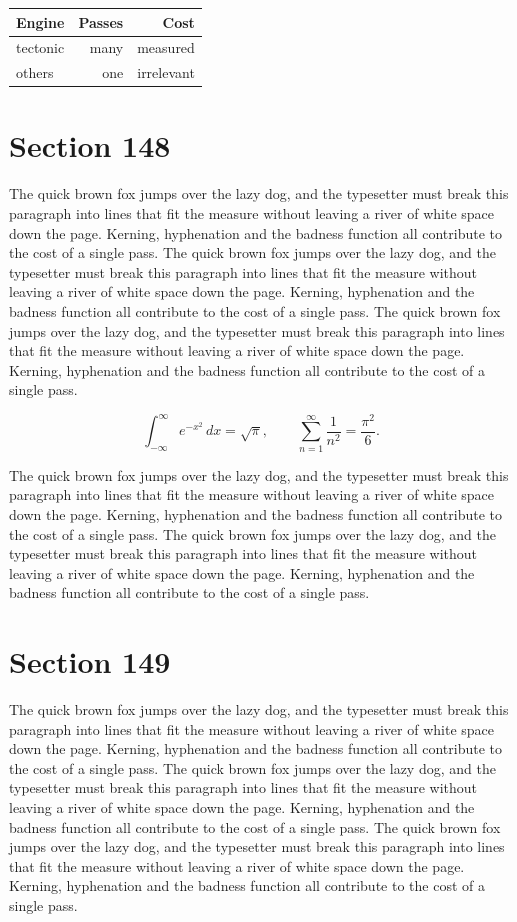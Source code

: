 \documentclass{article}
\begin{document}
\begin{center}
\begin{tabular}{lrr}
\toprule
Engine & Passes & Cost \\
\midrule
tectonic & many & measured \\
others & one & irrelevant \\
\bottomrule
\end{tabular}
\end{center}

\section{Section 148}
The quick brown fox jumps over the lazy dog, and the typesetter must break this paragraph into lines that fit the measure without leaving a river of white space down the page. Kerning, hyphenation and the badness function all contribute to the cost of a single pass. The quick brown fox jumps over the lazy dog, and the typesetter must break this paragraph into lines that fit the measure without leaving a river of white space down the page. Kerning, hyphenation and the badness function all contribute to the cost of a single pass. The quick brown fox jumps over the lazy dog, and the typesetter must break this paragraph into lines that fit the measure without leaving a river of white space down the page. Kerning, hyphenation and the badness function all contribute to the cost of a single pass. 

\begin{equation}
\int_{-\infty}^{\infty} e^{-x^{2}}\,dx = \sqrt{\pi}, \qquad
\sum_{n=1}^{\infty} \frac{1}{n^{2}} = \frac{\pi^{2}}{6}.
\end{equation}

The quick brown fox jumps over the lazy dog, and the typesetter must break this paragraph into lines that fit the measure without leaving a river of white space down the page. Kerning, hyphenation and the badness function all contribute to the cost of a single pass. The quick brown fox jumps over the lazy dog, and the typesetter must break this paragraph into lines that fit the measure without leaving a river of white space down the page. Kerning, hyphenation and the badness function all contribute to the cost of a single pass. 
\section{Section 149}
The quick brown fox jumps over the lazy dog, and the typesetter must break this paragraph into lines that fit the measure without leaving a river of white space down the page. Kerning, hyphenation and the badness function all contribute to the cost of a single pass. The quick brown fox jumps over the lazy dog, and the typesetter must break this paragraph into lines that fit the measure without leaving a river of white space down the page. Kerning, hyphenation and the badness function all contribute to the cost of a single pass. The quick brown fox jumps over the lazy dog, and the typesetter must break this paragraph into lines that fit the measure without leaving a river of white space down the page. Kerning, hyphenation and the badness function all contribute to the cost of a single pass. 
\end{document}
